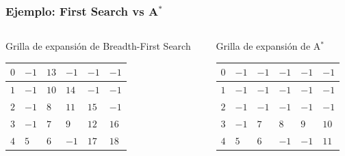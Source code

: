 \begin{frame}
    \frametitle{Ejemplo: First Search vs A$^{*}$}
    \begin{footnotesize}
        \begin{columns}[t]
            \begin{column}{5cm}
                \begin{center}
                    Grilla de expansión de Breadth-First Search
                \end{center}
                \begin{tabularx}{\columnwidth}{|X|X|X|X|X|X|}	
                    \hline
                    $0$ & $-1$ & $13$ & $-1$ & $-1$ & $-1$ \\
                    \hline
                    $1$ & $-1$ & $10$ & $14$ & $-1$ & $-1$ \\
                    \hline
                    $2$ & $-1$ & $8$ & $11$ & $15$ & $-1$ \\
                    \hline
                    $3$ & $-1$ & $7$ & $9$ & $12$ & $16$ \\
                    \hline
                    $4$ & $5$ & $6$ & $-1$ & $17$ & $18$ \\
                    \hline
                \end{tabularx}
            \end{column}
            \begin{column}{5cm}
                \begin{center}
                    Grilla de expansión de A$^{*}$
                \end{center}		
                \begin{tabularx}{\columnwidth}{|X|X|X|X|X|X|}		
                    \hline
                    $0$ & $-1$ & $-1$ & $-1$ & $-1$ & $-1$ \\
                    \hline
                    $1$ & $-1$ & $-1$ & $-1$ & $-1$ & $-1$ \\
                    \hline
                    $2$ & $-1$ & $-1$ & $-1$ & $-1$ & $-1$ \\
                    \hline
                    $3$ & $-1$ & $7$ & $8$ & $9$ & $10$ \\
                    \hline
                    $4$ & $5$ & $6$ & $-1$ & $-1$ & $11$ \\
                    \hline
                \end{tabularx}
            \end{column}
        \end{columns}
        

\end{footnotesize}
\end{frame}
